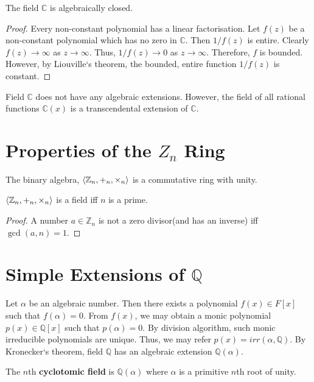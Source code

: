\begin{theorem}
	The field $\mathbb{C}$ is algebraically closed.
\end{theorem}
\begin{proof}
	Every non-constant polynomial has a linear factorisation.
	Let $f(z)$ be a non-constant polynomial which has no zero in $\mathbb{C}$.
	Then $1/f(z)$ is entire.
	Clearly $f(z) \to \infty$ as $z \to \infty$.
	Thus, $1/f(z) \to 0$ as $z \to \infty$.
	Therefore, $f$ is bounded.
	However, by Liouville`s theorem, the bounded, entire function $1/f(z)$ is constant.
\end{proof}

	Field $\mathbb{C}$ does not have any algebraic extensions. However, the field of all rational functions $\mathbb{C}(x)$ is a transcendental extension of $\mathbb{C}$.

\section{Properties of the $Z_n$ Ring}
	\par The binary algebra, $\left\langle \mathbb{Z}_n,+_n,\times_n \right\rangle$ is a commutative ring with unity. 

	\begin{theorem}
	$\left\langle \mathbb{Z}_n,+_n,\times_n \right\rangle$ is a field iff $n$ is a prime. 
	\end{theorem}
	\begin{proof}
		A number $a \in \mathbb{Z}_n$ is not a zero divisor(and has an inverse) iff $\gcd(a,n) = 1$.
	\end{proof}

\section{Simple Extensions of $\mathbb{Q}$}
	Let $\alpha$ be an algebraic number. Then there exists a polynomial $f(x) \in F[x]$ such that $f(\alpha) = 0$.
	From $f(x)$, we may obtain a monic polynomial $p(x) \in \mathbb{Q}[x]$ such that $p(\alpha) = 0$.
	By division algorithm, such monic irreducible polynomials are unique.
	Thus, we may refer $p(x) = irr(\alpha,\mathbb{Q})$.
	By Kronecker`s theorem, field $\mathbb{Q}$ has an algebraic extension $\mathbb{Q}(\alpha)$.
	
\begin{definition}
	The $n$th \textbf{cyclotomic field} is $\mathbb{Q}(\alpha)$ where $\alpha$ is a primitive $n$th root of unity.
\end{definition}

